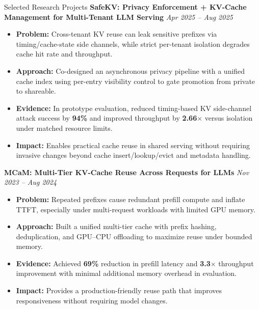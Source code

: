 \documentclass[]{resume}
\newcommand{\sectionvspace}{\vspace{1.5pt}}
\begin{document}
\begin{rSection}{Selected Research Projects}\sectionvspace
\textbf{SafeKV: Privacy Enforcement + KV-Cache Management for Multi-Tenant LLM Serving} \hfill \textit{Apr 2025 -- Aug 2025}
\begin{itemize}
  \item \textbf{Problem:} Cross-tenant KV reuse can leak sensitive prefixes via timing/cache-state side channels, while strict per-tenant isolation degrades cache hit rate and throughput.
  \item \textbf{Approach:} Co-designed an asynchronous privacy pipeline with a unified cache index using per-entry visibility control to gate promotion from private to shareable.
  \item \textbf{Evidence:} In prototype evaluation, reduced timing-based KV side-channel attack success by \textbf{94\%} and improved throughput by \textbf{2.66$\times$} versus isolation under matched resource limits.
  \item \textbf{Impact:} Enables practical cache reuse in shared serving without requiring invasive changes beyond cache insert/lookup/evict and metadata handling.
\end{itemize}

\newpage
\textbf{MCaM: Multi-Tier KV-Cache Reuse Across Requests for LLMs} \hfill \textit{Nov 2023 -- Aug 2024}
\begin{itemize}
  \item \textbf{Problem:} Repeated prefixes cause redundant prefill compute and inflate TTFT, especially under multi-request workloads with limited GPU memory.
  \item \textbf{Approach:} Built a unified multi-tier cache with prefix hashing, deduplication, and GPU--CPU offloading to maximize reuse under bounded memory.
  \item \textbf{Evidence:} Achieved \textbf{69\%} reduction in prefill latency and \textbf{3.3$\times$} throughput improvement with minimal additional memory overhead in evaluation.
  \item \textbf{Impact:} Provides a production-friendly reuse path that improves responsiveness without requiring model changes.
\end{itemize}


\end{rSection}
\end{document}
